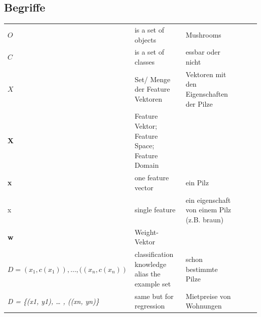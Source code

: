 \documentclass[11pt,a4paper]{article}
\author{Bianca}
\begin{document}
\begin{flushleft}
\section{Begriffe}
\begin{table}[]
{
\begin{tabular}{l p{} l p{} l p{}}
$O$ & is a set of objects  & Mushrooms \\
$C$ & is a set of classes  & essbar oder nicht \\
$X$ & Set/ Menge der Feature Vektoren & Vektoren mit den Eigenschaften der Pilze                 \\
\textbf{X}                                                             & Feature Vektor; Feature Space; Feature Domain                                      &                                                                                                                       \\
\textbf{x}                                                             & one feature vector                                                                 & ein Pilz                                                                                                              \\
x                                                                      & single feature                                                                     & ein eigenschaft von einem Pilz (z.B. braun)                                                                          \\
\textbf{w}                                                             & Weight-Vektor                                                                      &                                                                                                                       \\
$D={(x_1, c(x_1)),…, ((x_n, c(x_n))}$                         & classification knowledge alias the example set                                     & schon bestimmte Pilze                                                                                                 \\
\textit{D = \{(x1, y1), … , ((xn, yn)\}}                               & same but for regression                                                            & Mietpreise von Wohnungen                                                                                             \\

\end{tabular}}
\end{table}
\end{flushleft}
\end{document}
